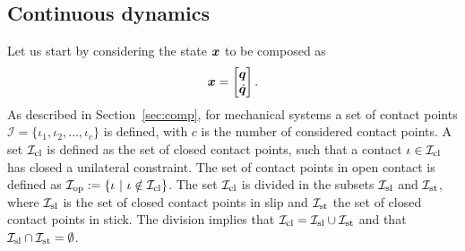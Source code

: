 \documentclass[../DC2019003Bouma.tex]{subfiles}
\begin{document}
\subsection{Continuous dynamics}\label{sec:2contdyn}
Let us start by considering the state ${\boldsymbol{x}}$ to be composed as
\begin{align}
{\boldsymbol{x}} = \begin{bmatrix}
{\boldsymbol{q}}\\ \dot{{\boldsymbol{q}}}
\end{bmatrix}.
\end{align}
As described in Section~\ref{sec:comp}, for mechanical systems a set of contact points $\mathcal{I} = \{\iota_1,\iota_2,\dots,\iota_c\}$ is defined, with $c$ is the number of considered contact points. A set $\mathcal{I}_{\text{cl}}$ is defined as the set of closed contact points, such that a contact $\iota\in\mathcal{I}_{\text{cl}}$ has closed a unilateral constraint. The set of contact points in open contact is defined as $\Ic_{\text{op}} := \{\iota\ |\ \iota\notin\Ic_{\text{cl}}\}$. The set $\mathcal{I}_{\text{cl}}$ is divided in the subsets $\mathcal{I}_{\text{sl}}$ and $\mathcal{I}_{\text{st}}$, where $\mathcal{I}_{\text{sl}}$ is the set of closed contact points in slip and $\mathcal{I}_{\text{st}}$ the set of closed contact points in stick. The division implies that $\mathcal{I}_{\text{cl}} =\mathcal{I}_{\text{sl}}\cup\mathcal{I}_{\text{st}}$ and that $\mathcal{I}_{\text{sl}}\cap\mathcal{I}_{\text{st}}=\emptyset$. 
\end{document}
